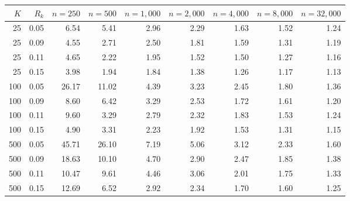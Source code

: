 \begin{tabular}{rrrrrrrrr}
\toprule
$K$ & $R_k$ & $n=250$ & $n=500$ & $n=1,000$ & $n=2,000$ & $n=4,000$ & $n=8,000$ & $n=32,000$ \\
\midrule
25 & 0.05 & 6.54 & 5.41 & 2.96 & 2.29 & 1.63 & 1.52 & 1.24 \\
25 & 0.09 & 4.55 & 2.71 & 2.50 & 1.81 & 1.59 & 1.31 & 1.19 \\
25 & 0.11 & 4.65 & 2.22 & 1.95 & 1.52 & 1.50 & 1.27 & 1.16 \\
25 & 0.15 & 3.98 & 1.94 & 1.84 & 1.38 & 1.26 & 1.17 & 1.13 \\
100 & 0.05 & 26.17 & 11.02 & 4.39 & 3.23 & 2.45 & 1.80 & 1.36 \\
100 & 0.09 & 8.60 & 6.42 & 3.29 & 2.53 & 1.72 & 1.61 & 1.20 \\
100 & 0.11 & 9.60 & 3.29 & 2.79 & 2.32 & 1.83 & 1.53 & 1.24 \\
100 & 0.15 & 4.90 & 3.31 & 2.23 & 1.92 & 1.53 & 1.31 & 1.15 \\
500 & 0.05 & 45.71 & 26.10 & 7.19 & 5.06 & 3.12 & 2.33 & 1.60 \\
500 & 0.09 & 18.63 & 10.10 & 4.70 & 2.90 & 2.47 & 1.85 & 1.38 \\
500 & 0.11 & 10.47 & 9.61 & 4.46 & 3.06 & 2.01 & 1.75 & 1.33 \\
500 & 0.15 & 12.69 & 6.52 & 2.92 & 2.34 & 1.70 & 1.60 & 1.25 \\
\bottomrule
\end{tabular}
